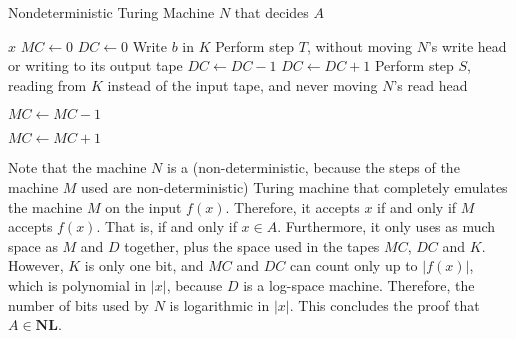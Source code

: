 \documentclass{amsart}
\theoremstyle{plain}
\theoremstyle{definition}
\newcommand{\nl}{\textbf{NL}}
\begin{document}
\begin{enumerate}[label=\textbf{Exercise \arabic*:}, leftmargin=0cm, labelwidth=-0.2cm, align=left]
            \begin{algorithm}[H]
            \caption{Nondeterministic Turing Machine $N$ that decides $A$}
            \label{alg:kpartite}
            \begin{algorithmic}[1]
                \Require $x$
                \State $MC \gets 0$
                        \State $DC \gets 0$
                                \State Write $b$ in $K$
                            \EndIf
                            \State Perform step $T$, without moving $N$'s write head or writing to its output tape
                                \State $DC \gets DC - 1$
                                \State $DC \gets DC + 1$
                            \EndIf
                        \EndFor
                    \EndIf
                    \State Perform step $S$, reading from $K$ instead of the input tape, and never moving $N$'s read head

                        \State $MC \gets MC - 1$

                        \State $MC \gets MC + 1$

                    \EndIf
                \EndFor
                
                    \end{algorithmic}
        \end{algorithm}

    \end{enumerate}

    Note that the machine $N$ is a (non-deterministic, because the steps of the machine
    $M$ used are non-deterministic) Turing machine that completely emulates the machine $M$
    on the input $f(x)$.
    Therefore, it accepts $x$ if and only if $M$ accepts $f(x)$.
    That is, if and only if $x \in A$.
    Furthermore, it only uses as much space as $M$ and $D$ together, plus
    the space used in the tapes $MC$, $DC$ and $K$.
    However, $K$ is only one bit, and $MC$ and $DC$ can count only up to $|f(x)|$, which is polynomial in $|x|$,
    because $D$ is a log-space machine.
    Therefore, the number of bits used by $N$ is logarithmic in $|x|$.
    This concludes the proof that $A \in \nl$.
\end{document}

